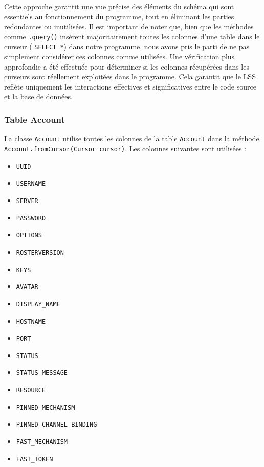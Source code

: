 \documentclass[a4paper,11pt]{article}
\begin{document}
Cette approche garantit une vue précise des éléments du schéma qui sont essentiels au fonctionnement du programme, tout en éliminant les parties redondantes ou inutilisées. 
Il est important de noter que, bien que les méthodes comme \texttt{.query()} insèrent majoritairement toutes les colonnes d'une table dans le curseur ( \texttt{SELECT *}) dans notre programme, nous avons pris le parti de ne pas simplement considérer ces colonnes comme utilisées. Une vérification plus approfondie a été effectuée pour déterminer si les colonnes récupérées dans les curseurs sont réellement exploitées dans le programme. Cela garantit que le LSS reflète uniquement les interactions effectives et significatives entre le code source et la base de données.


\subsubsection*{Table Account}

La classe \texttt{Account} utilise toutes les colonnes de la table \texttt{Account} dans la méthode \texttt{Account.fromCursor(Cursor cursor)}. Les colonnes suivantes sont utilisées :

\begin{itemize}
    \item \texttt{UUID}
    \item \texttt{USERNAME}
    \item \texttt{SERVER}
    \item \texttt{PASSWORD}
    \item \texttt{OPTIONS}
    \item \texttt{ROSTERVERSION}
    \item \texttt{KEYS}
    \item \texttt{AVATAR}
    \item \texttt{DISPLAY\_NAME}
    \item \texttt{HOSTNAME}
    \item \texttt{PORT}
    \item \texttt{STATUS}
    \item \texttt{STATUS\_MESSAGE}
    \item \texttt{RESOURCE}
    \item \texttt{PINNED\_MECHANISM}
    \item \texttt{PINNED\_CHANNEL\_BINDING}
    \item \texttt{FAST\_MECHANISM}
    \item \texttt{FAST\_TOKEN}
\end{itemize}
\end{document}
